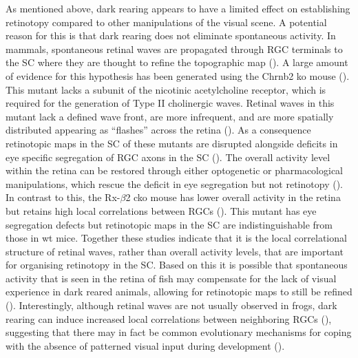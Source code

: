 As mentioned above, dark rearing appears to have a limited effect on establishing retinotopy compared to other manipulations of the visual scene. A potential reason for this is that dark rearing does not eliminate spontaneous activity. In mammals, spontaneous retinal waves are propagated through RGC terminals to the SC where they are thought to refine the topographic map (\cite{Pratt2016AnDevelopment}). A large amount of evidence for this hypothesis has been generated using the Chrnb2 \gls{ko} mouse (\cite{Rossi2001RequirementSystem,McLaughlin2003RetinotopicDevelopment,Mrsic-Flogel2005AlteredWaves}). This mutant lacks a subunit of the nicotinic acetylcholine receptor, which is required for the generation of Type II cholinergic waves. Retinal waves in this mutant lack a defined wave front, are more infrequent, and are more spatially distributed appearing as “flashes” across the retina (\cite{Burbridge2014VisualReceptors}). As a consequence retinotopic maps in the SC of these mutants are disrupted alongside deficits in eye specific segregation of RGC axons in the SC (\cite{McLaughlin2003RetinotopicDevelopment, Rossi2001RequirementSystem,Mrsic-Flogel2005AlteredWaves}). The overall activity level within the retina can be restored through either optogenetic or pharmacological manipulations, which rescue the deficit in eye segregation but not retinotopy (\cite{Zhang2012, Burbridge2014VisualReceptors}). In contrast to this, the Rx-$\beta$2 \gls{cko} mouse has lower overall activity in the retina but retains high local correlations between RGCs (\cite{Xu2015SpatialFrequency}). This mutant has eye segregation defects but retinotopic maps in the SC are indistinguishable from those in \gls{wt} mice. Together these studies indicate that it is the local correlational structure of retinal waves, rather than overall activity levels, that are important for organising retinotopy in the SC. Based on this it is possible that spontaneous activity that is seen in the retina of fish may compensate for the lack of visual experience in dark reared animals, allowing for retinotopic maps to still be refined (\cite{Kutsarova2017RulesBrain}). Interestingly, although retinal waves are not usually observed in frogs, dark rearing can induce increased local correlations between neighboring RGCs (\cite{Demas2012VisionRetina}), suggesting that there may in fact be common evolutionary mechanisms for coping with the absence of patterned visual input during development (\cite{Pratt2016AnDevelopment}).

